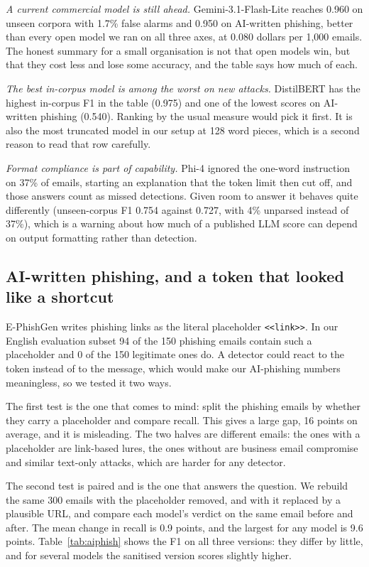 \textit{A current commercial model is still ahead.} Gemini-3.1-Flash-Lite
reaches 0.960 on unseen corpora with 1.7\% false alarms and 0.950 on
AI-written phishing, better than every open model we ran on all three axes, at
0.080 dollars per 1{,}000 emails. The honest summary for a small
organisation is not that open models win, but that they cost less and lose
some accuracy, and the table says how much of each.

\textit{The best in-corpus model is among the worst on new attacks.}
DistilBERT has the highest in-corpus F1 in the table (0.975) and one of the
lowest scores on AI-written phishing (0.540). Ranking by the usual measure
would pick it first. It is also the most truncated model in our setup at 128
word pieces, which is a second reason to read that row carefully.

\textit{Format compliance is part of capability.} Phi-4 ignored the one-word
instruction on 37\% of emails, starting an explanation that the token
limit then cut off, and those answers count as missed detections. Given room to
answer it behaves quite differently (unseen-corpus F1 0.754 against 0.727, with 4\% unparsed instead of 37\%), which is a warning
about how much of a published LLM score can depend on output formatting rather
than detection.

\subsection{AI-written phishing, and a token that looked like a shortcut}

E-PhishGen writes phishing links as the literal placeholder
\texttt{<<link>>}. In our English evaluation subset 94 of the 150 phishing
emails contain such a placeholder and 0 of the 150 legitimate ones do. A
detector could react to the token instead of to the message, which would make
our AI-phishing numbers meaningless, so we tested it two ways.

The first test is the one that comes to mind: split the phishing emails by
whether they carry a placeholder and compare recall. This gives a large gap,
16 points on average, and it is misleading. The two halves are different
emails: the ones with a placeholder are link-based lures, the ones without are
business email compromise and similar text-only attacks, which are harder for
any detector.

The second test is paired and is the one that answers the question. We rebuild
the same 300 emails with the placeholder removed, and with it replaced by a
plausible URL, and compare each model's verdict on the same email before and
after. The mean change in recall is 0.9 points, and the largest for any
model is 9.6 points. Table~\ref{tab:aiphish} shows the F1 on all three versions:
they differ by little, and for several models the sanitised version scores
slightly higher.

